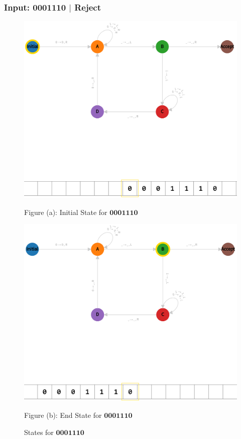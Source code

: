 \subsubsection*{Input: 0001110 $|$ Reject}
\label{q1-0001110}

\begin{figure}[ht]
  \centering
  \begin{minipage}{.49\linewidth}
    \centering
    \includegraphics[width=\linewidth]{answers/img/q1-0001110-initial.png}
    \caption*{Figure (a): Initial State for $\mathbf{0001110}$}
    \label{fig:0001110-initial}
  \end{minipage}
  \begin{minipage}{.49\linewidth}
    \centering
    \includegraphics[width=\linewidth]{answers/img/q1-0001110-end.png}
    \caption*{Figure (b): End State for $\mathbf{0001110}$}
    \label{fig:0001110-end}
  \end{minipage}
  \caption{States for $\mathbf{0001110}$}
  \label{fig:in-0001110}
\end{figure}


